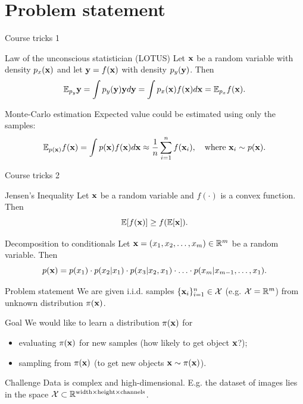 \section{Problem statement}
\begin{frame}{Course tricks 1}
	\begin{block}{Law of the unconscious statistician (LOTUS)}
		Let $\mathbf{x}$ be a random variable with density $p_x(\mathbf{x})$ and let $\mathbf{y}=f(\mathbf{x})$ with density $p_y(\mathbf{y})$. Then
		\[
			\mathbb{E}_{p_y} \mathbf{y} = \int p_y(\mathbf{y}) \mathbf{y} d \mathbf{y} = \int p_x(\mathbf{x}) f(\mathbf{x}) d \mathbf{x} = \mathbb{E}_{p_x} f(\mathbf{x}).
		\]
	\end{block}
	\begin{block}{Monte-Carlo estimation}
		Expected value could be estimated using only the samples:
		\[
			\mathbb{E}_{p(\mathbf{x})} f(\mathbf{x}) = \int p(\mathbf{x}) f(\mathbf{x}) d \mathbf{x} \approx \frac{1}{n} \sum_{i=1}^n f(\mathbf{x}_i), \quad 
			\text{where } \mathbf{x}_i \sim p(\mathbf{x}).
		\]
	\end{block}
\end{frame}
\begin{frame}{Course tricks 2}
	\begin{block}{Jensen's Inequality}
		Let $\mathbf{x}$ be a random variable and $f(\cdot)$ is a convex function. Then
		\[
			\mathbb{E} [f(\mathbf{x})] \geq f(\mathbb{E}[\mathbf{x}]).
		\]
	\end{block}
	\begin{block}{Decomposition to conditionals}
	Let $\mathbf{x} = (x_1, x_2, \ldots, x_m) \in \mathbb{R}^m$ be a random variable. Then 
	\[
		p(\mathbf{x}) = p(x_1) \cdot p(x_2 | x_1) \cdot p(x_3 | x_2, x_1) \cdot \ldots \cdot p(x_m|x_{m-1},\dots,x_1).
	\]
	\end{block}
\end{frame}
\begin{frame}{Problem statement}
	We are given i.i.d. samples $\{\mathbf{x}_i\}_{i=1}^n \in \mathcal{X}$ (e.g. $\mathcal{X} = \mathbb{R}^m$) from unknown distribution $\pi(\mathbf{x})$.
	
	\begin{block}{Goal}
		We would like to learn a distribution $\pi(\mathbf{x})$ for 
		\begin{itemize}
		    \item evaluating $\pi(\mathbf{x})$ for new samples (how likely to get object $\mathbf{x}$?);
		    \item sampling from $\pi(\mathbf{x})$ (to get new objects $\mathbf{x} \sim \pi(\mathbf{x})$).
		\end{itemize}
	\end{block}
	\begin{block}{Challenge}
		 Data is complex and high-dimensional. E.g. the dataset of images lies in the space $\mathcal{X} \subset \mathbb{R}^{\text{width} \times \text{height} \times \text{channels}}$.
	\end{block}
\end{frame}
